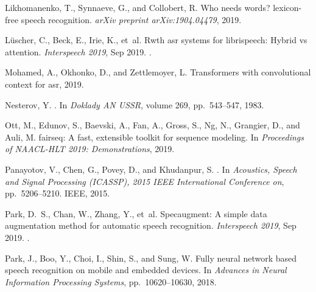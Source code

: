 \documentclass{article}
\begin{document}
\begin{thebibliography}{99}
Likhomanenko, T., Synnaeve, G., and Collobert, R.
\newblock Who needs words? lexicon-free speech recognition.
\newblock \emph{arXiv preprint arXiv:1904.04479}, 2019.

Lüscher, C., Beck, E., Irie, K., et~al.
\newblock Rwth asr systems for librispeech: Hybrid vs attention.
\newblock \emph{Interspeech 2019}, Sep 2019.
\newblock {}.

Mohamed, A., Okhonko, D., and Zettlemoyer, L.
\newblock Transformers with convolutional context for asr, 2019.

Nesterov, Y.
.
\newblock In \emph{Doklady AN USSR}, volume 269, pp.\  543--547, 1983.

Ott, M., Edunov, S., Baevski, A., Fan, A., Gross, S., Ng, N., Grangier, D., and
  Auli, M.
\newblock fairseq: A fast, extensible toolkit for sequence modeling.
\newblock In \emph{Proceedings of NAACL-HLT 2019: Demonstrations}, 2019.

Panayotov, V., Chen, G., Povey, D., and Khudanpur, S.
.
\newblock In \emph{Acoustics, Speech and Signal Processing (ICASSP), 2015 IEEE
  International Conference on}, pp.\  5206--5210. IEEE, 2015.

Park, D.~S., Chan, W., Zhang, Y., et~al.
\newblock Specaugment: A simple data augmentation method for automatic speech
  recognition.
\newblock \emph{Interspeech 2019}, Sep 2019.
\newblock {}.

Park, J., Boo, Y., Choi, I., Shin, S., and Sung, W.
\newblock Fully neural network based speech recognition on mobile and embedded
  devices.
\newblock In \emph{Advances in Neural Information Processing Systems}, pp.\
  10620--10630, 2018.


\end{thebibliography}
\end{document}
